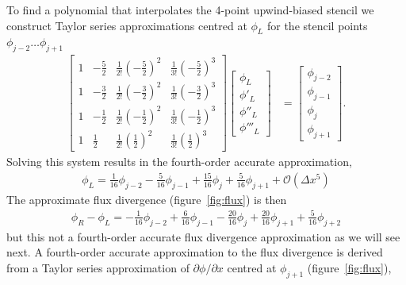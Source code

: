 \documentclass{article}
\begin{document}
To find a polynomial that interpolates the 4-point upwind-biased stencil we construct Taylor series approximations centred at $\phi_L$ for the stencil points $\phi_{j-2} \ldots \phi_{j+1}$
\begin{align}
	\begin{bmatrix}
		1 & -\frac{5}{2} & \frac{1}{2!} \left(-\frac{5}{2}\right)^2 & \frac{1}{3!} \left(-\frac{5}{2}\right)^3 \\[4pt]
		1 & -\frac{3}{2} & \frac{1}{2!} \left(-\frac{3}{2}\right)^2 & \frac{1}{3!} \left(-\frac{3}{2}\right)^3 \\[4pt]
		1 & -\frac{1}{2} & \frac{1}{2!} \left(-\frac{1}{2}\right)^2 & \frac{1}{3!} \left(-\frac{1}{2}\right)^3 \\[4pt]
		1 & \frac{1}{2} & \frac{1}{2!} \left(\frac{1}{2}\right)^2 & \frac{1}{3!} \left(\frac{1}{2}\right)^3
	\end{bmatrix}
	\begin{bmatrix}
		\phi_L \\
		\phi'_L \\
		\phi''_L \\
		\phi'''_L
	\end{bmatrix}
	&=
	\begin{bmatrix}
		\phi_{j-2} \\
		\phi_{j-1} \\
		\phi_j \\
		\phi_{j+1}
	\end{bmatrix}
	\text{.}
\end{align}
Solving this system results in the fourth-order accurate approximation, 
\begin{align}
	\phi_L = \frac{1}{16} \phi_{j-2} - \frac{5}{16} \phi_{j-1} + \frac{15}{16} \phi_j + \frac{5}{16} \phi_{j+1} + \mathcal{O}(\Delta x^5)
\end{align}
The approximate flux divergence (figure~\ref{fig:flux}) is then 
\begin{align}
	\phi_R - \phi_L = -\frac{1}{16} \phi_{j-2} + \frac{6}{16} \phi_{j-1} - \frac{20}{16} \phi_j + \frac{20}{16} \phi_{j+1} + \frac{5}{16} \phi_{j+2} \label{eq:cubicFitCoeffs}
\end{align}
but this not a fourth-order accurate flux divergence approximation as we will see next.
A fourth-order accurate approximation to the flux divergence is derived from a Taylor series approximation of $\partial \phi / \partial x$ centred at $\phi_{j+1}$ (figure~\ref{fig:flux}),
\end{document}
